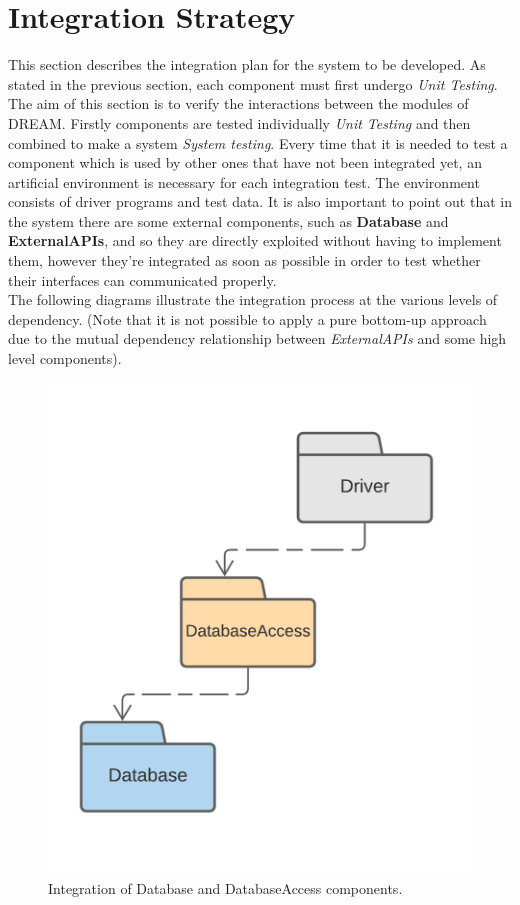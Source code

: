 \section{Integration Strategy}

This section describes the integration plan for the system to be developed. As stated in the previous section, each component must first undergo \textit{Unit Testing}.
The aim of this section is to verify the interactions between the modules of DREAM. 
Firstly components are tested individually \textit{Unit Testing} and then combined to make a system \textit{System testing}.
Every time that it is needed to test a component which is used by other ones that have not been integrated yet, an artificial environment is necessary for each integration test. The environment consists of driver programs and test data.
It is also important to point out that in the system there are some external components, such as \textbf{Database} and \textbf{ExternalAPIs}, and so they are directly exploited without having to implement them, however they're integrated as soon as possible in order to test whether their interfaces can communicated properly.\\
The following diagrams illustrate the integration process at the various levels of dependency.
(Note that it is not possible to apply a pure bottom-up approach due to the mutual dependency relationship between \textit{ExternalAPIs} and some high level components).
\begin{center}
    \begin{figure}[h!]
    \centering
  \includegraphics[scale=0.25] {./Images/IntegrationStrategy/IT1.png}
  \caption{Integration of Database and DatabaseAccess components.}
\end{figure}
\end{center}



